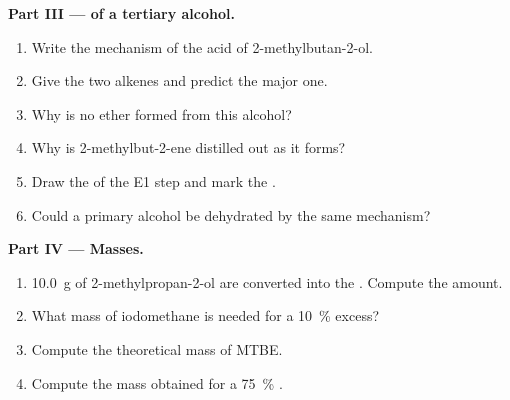 \begin{problem}
\medskip
\noindent\textbf{Part III ---  of a tertiary alcohol.}
\begin{enumerate}[resume]
  \item Write the mechanism of the acid  of
        2-methylbutan-2-ol.
  \item Give the two alkenes and predict the major one.
  \item Why is no ether formed from this alcohol?
  \item Why is 2-methylbut-2-ene distilled out as it forms?
  \item Draw the  of the E1 step and mark the
        .
  \item Could a primary alcohol be dehydrated by the same mechanism?
\end{enumerate}

\medskip
\noindent\textbf{Part IV --- Masses.}
\begin{enumerate}[resume]
  \item \qty{10.0}{g} of 2-methylpropan-2-ol are converted into the
        . Compute the amount.
  \item What mass of iodomethane is needed for a \qty{10}{\percent} excess?
  \item Compute the theoretical mass of MTBE.
  \item Compute the mass obtained for a \qty{75}{\percent} .
\end{enumerate}
\end{problem}
